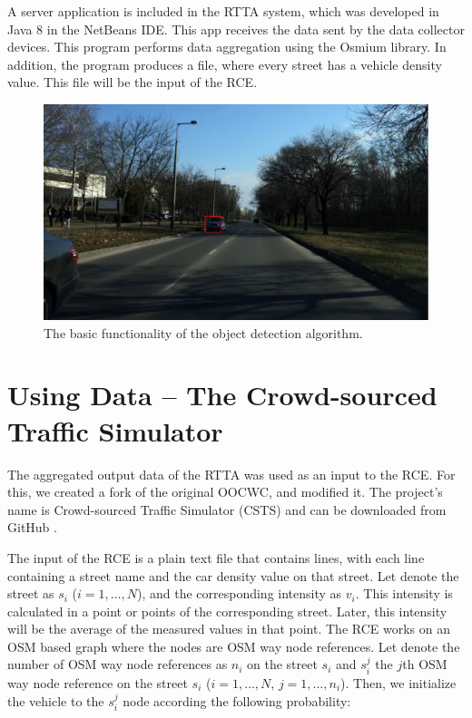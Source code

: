 \documentclass[b5paper,12pt]{report}
\theoremstyle{definition}
\begin{document}
A server application is included in the RTTA system, which was developed in Java 8 in the NetBeans IDE. This app receives the data sent by the data collector devices. This program performs data aggregation using the Osmium library. In addition, the program produces a file, where every street has a vehicle density value. This file will be the input of the RCE.

\begin{figure}[ht]
\centerline{
\includegraphics[width=12.6cm]{img/carredrect.png}}
\caption{The basic functionality of the object detection algorithm.}
\label{carredrect}
\end{figure}

\section{Using Data -- The Crowd-sourced Traffic Simulator}
\label{cstssect}

The aggregated output data of the RTTA was used as an input to the RCE. For this, we created a fork of the original OOCWC, and modified it. The project's name is Crowd-sourced Traffic Simulator (CSTS) and can be downloaded from GitHub \cite{csts-repo}.

The input of the RCE is a plain text file that contains lines, with each line containing a street name and the car density value on that street. Let denote the street as $s_i$ ($i=1, \dots, N$), and the corresponding intensity as $v_i$. This intensity is calculated in a point or points of the corresponding street. Later, this intensity will be the average of the measured values in that point. The RCE works on an OSM based graph where the nodes are OSM way node references. Let denote the number of OSM way node references as $n_i$ on the street $s_i$ and $s_i^j$ the $j$th OSM way node reference on the street $s_i$ ($i=1, \dots, N$, $j=1, \dots, n_i$). Then, we initialize the vehicle to the $s_i^j$ node according the following probability:
\end{document}
